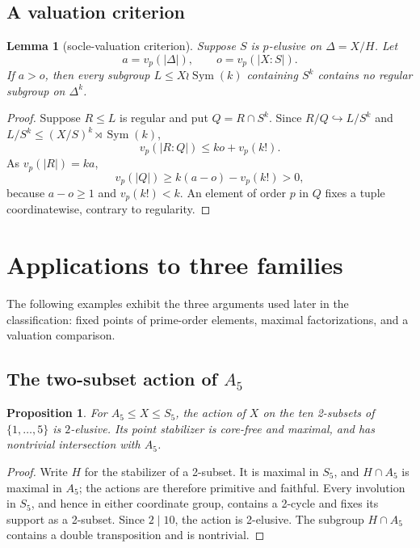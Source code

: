 \documentclass[11pt]{amsart}
\newcommand{\Sym}{\operatorname{Sym}}
\newtheorem{proposition}[theorem]{Proposition}
\newtheorem{lemma}[theorem]{Lemma}
\theoremstyle{definition}
\begin{document}
\subsection{A valuation criterion}

\begin{lemma}[socle-valuation criterion]\label{lem:valuation}
Suppose \(S\) is \(p\)-elusive on \(\Delta=X/H\).  Let
\[
a=v_p(\lvert\Delta\rvert),\qquad
o=v_p(\lvert X:S\rvert).
\]
If \(a>o\), then every subgroup \(L\leq X\wr\Sym(k)\) containing \(S^k\)
contains no regular subgroup on \(\Delta^k\).
\end{lemma}

\begin{proof}
Suppose \(R\leq L\) is regular and put \(Q=R\cap S^k\). Since
\(R/Q\hookrightarrow L/S^k\) and
\(L/S^k\leq (X/S)^k\rtimes\Sym(k)\),
\[
v_p(\lvert R:Q\rvert)\leq ko+v_p(k!).
\]
As \(v_p(\lvert R\rvert)=ka\),
\[
v_p(\lvert Q\rvert)\geq k(a-o)-v_p(k!)>0,
\]
because \(a-o\ge1\) and \(v_p(k!)<k\).  An element of order \(p\) in \(Q\)
fixes a tuple coordinatewise, contrary to regularity.
\end{proof}


\section{Applications to three families}\label{sec:representative}

The following examples exhibit the three arguments used later in the
classification: fixed points of prime-order elements, maximal
factorizations, and a valuation comparison.

\subsection{\texorpdfstring{The two-subset action of \(A_5\)}%
{The two-subset action of A5}}

\begin{proposition}\label{prop:a5-elusive}
For \(A_5\leq X\leq S_5\), the action of \(X\) on the ten 2-subsets of
\(\{1,\ldots,5\}\) is \(2\)-elusive.  Its point stabilizer is core-free and
maximal, and has nontrivial intersection with \(A_5\).
\end{proposition}

\begin{proof}
Write \(H\) for the stabilizer of a 2-subset.  It is maximal in \(S_5\),
and \(H\cap A_5\) is maximal in \(A_5\); the actions are therefore
primitive and faithful.
Every involution in \(S_5\), and hence in either coordinate group, contains a
2-cycle and fixes its support as a 2-subset.  Since \(2\mid10\), the action is
2-elusive.  The subgroup \(H\cap A_5\) contains a double transposition and is
nontrivial.
\end{proof}
\end{document}
